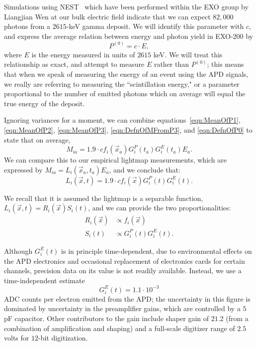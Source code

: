 Simulations using NEST~\cite{NESTpaper} which have been performed within the EXO group by Liangjian Wen at our bulk electric field indicate that we can expect $82,000$ photons from a $2615$-keV gamma deposit.  We will identify this parameter with $c$, and express the average relation between energy and photon yield in EXO-200 by
\begin{equation} \label{eqn:DefnOfP0}
P^{(0)} = c \cdot E,
\end{equation}
where $E$ is the energy measured in units of $2615$ keV.  We will treat this relationship as exact, and attempt to measure $E$ rather than $P^{(0)}$; this means that when we speak of measuring the energy of an event using the APD signals, we really are referring to measuring the ``scintillation energy," or a parameter proportional to the number of emitted photons which on average will equal the true energy of the deposit.

Ignoring variances for a moment, we can combine equations~\ref{eqn:MeanOfP1}, \ref{eqn:MeanOfP2}, \ref{eqn:MeanOfP3}, \ref{eqn:DefnOfMFromP3}, and \ref{eqn:DefnOfP0} to state that on average,
\begin{equation}
M_{ia} = 1.9 \cdot c f_i(\vec{x}_a) G^P_i(t_a) G^E_i(t_a) E_a.
\end{equation}
We can compare this to our empirical lightmap measurements, which are expressed by $M_{ia} = L_i(\vec{x}_a,t_a) E_a$,
and we conclude that:
\begin{equation}
L_i(\vec{x},t) = 1.9 \cdot c f_i(\vec{x}) G^P_i(t) G^E_i(t).
\end{equation}

We recall that it is assumed the lightmap is a separable function, $L_i(\vec{x},t) = R_i(\vec{x})S_i(t)$, and we can provide the two proportionalities:
\begin{subequations}\begin{align}
R_i(\vec{x}) &\propto f_i(\vec{x}) \\
S_i(t) &\propto G^P_i(t) G^E_i(t).
\end{align}\end{subequations}

Although $G^E_i(t)$ is in principle time-dependent, due to environmental effects on the APD electronics and occasional replacement of electronics cards for certain channels, precision data on its value is not readily available.  Instead, we use a time-independent estimate
\begin{equation}
G^E_i(t) = 1.1 \cdot 10^{-3} \label{eqn:ValueOfGE}
\end{equation}
ADC counts per electron emitted from the APD; the uncertainty in this figure is dominated by uncertainty in the preamplifier gains, which are controlled by a $5$ pF capacitor.  Other contributors to the gain include shaper gain of $21.2$ (from a combination of amplification and shaping) and a full-scale digitizer range of $2.5$ volts for $12$-bit digitization.

